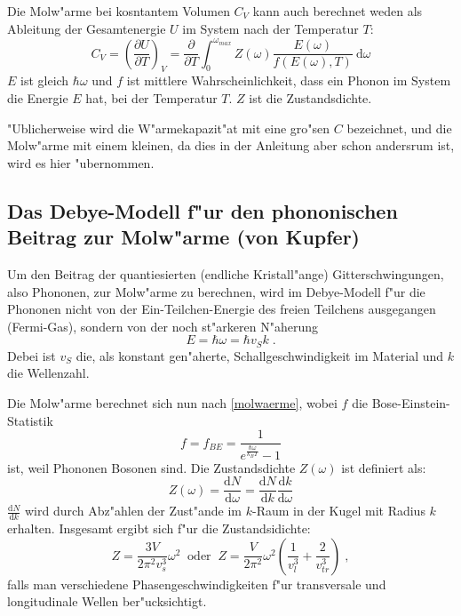     Die Molw"arme bei kosntantem Volumen $C_V$ kann auch berechnet weden als Ableitung der Gesamtenergie $U$ im System nach der Temperatur $T$:
    \begin{equation}
      C_V = \left( \frac{\partial U}{\partial T} \right)_V = \frac{\partial}{\partial T} \int_{0}^{\omega_{max}} Z(\omega)\frac{E(\omega)}{f(E(\omega),T)} \: \text{d}\omega
      \label{molwaerme}
    \end{equation}
    $E$ ist gleich $\hbar \omega$ und $f$ ist mittlere Wahrscheinlichkeit, dass ein Phonon im System die Energie $E$ hat, bei der Temperatur $T$.
    $Z$ ist die Zustandsdichte.

    "Ublicherweise wird die W"armekapazit"at mit eine gro"sen $C$ bezeichnet, und die Molw"arme mit einem kleinen, da dies in der Anleitung aber schon andersrum ist, wird es hier "ubernommen.




  \subsection{Das Debye-Modell f"ur den phononischen Beitrag zur Molw"arme (von Kupfer)}
    Um den Beitrag der quantiesierten (endliche Kristall"ange) Gitterschwingungen, also Phononen, zur Molw"arme zu berechnen, wird im Debye-Modell f"ur die Phononen nicht von der Ein-Teilchen-Energie des freien Teilchens ausgegangen (Fermi-Gas), sondern von der noch st"arkeren N"aherung
    \begin{equation}
      E = \hbar \omega = \hbar v_S k \; .
    \end{equation}
    Debei ist $v_S$ die, als konstant gen"aherte, Schallgeschwindigkeit im Material und $k$ die Wellenzahl.

    Die Molw"arme berechnet sich nun nach \ref{molwaerme}, wobei $f$ die Bose-Einstein-Statistik
    \begin{equation}
      f=f_{BE}=\frac{1}{e^{\frac{\hbar \omega}{k_B T}}-1}
    \end{equation}
    ist, weil Phononen Bosonen sind.
    Die Zustandsdichte $Z(\omega)$ ist definiert als:
    \begin{equation}
      Z(\omega) = \frac{\text{d}N}{\text{d}\omega} = \frac{\text{d}N}{\text{d}k} \frac{\text{d}k}{\text{d}\omega}
    \end{equation}
    $\frac{\text{d}N}{\text{d}k}$ wird durch Abz"ahlen der Zust"ande im $k$-Raum in der Kugel mit Radius $k$ erhalten.
    Insgesamt ergibt sich f"ur die Zustandsidichte:
    \begin{equation}
      Z = \frac{3V}{2\pi^2v_s^3}\omega^2 \; \; \text{oder} \; \; Z = \frac{V}{2\pi^2}\omega^2 \left( \frac{1}{v_l^3}  + \frac{2}{v_{tr}^3} \right) \; ,
    \end{equation}
    falls man verschiedene Phasengeschwindigkeiten f"ur transversale und longitudinale Wellen ber"ucksichtigt.

